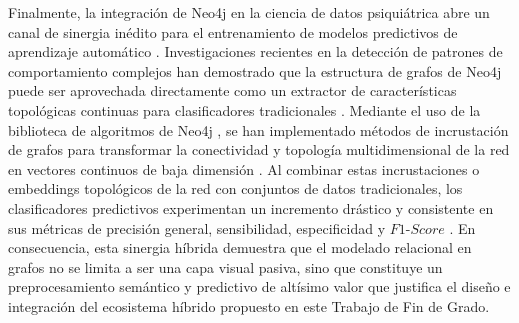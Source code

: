 \documentclass[12pt,a4paper,onecolumn,oneside]{report}
\begin{document}
Finalmente, la integración de Neo4j en la ciencia de datos psiquiátrica abre un canal de sinergia inédito para el entrenamiento de modelos predictivos de aprendizaje automático \cite{raj2022predicting}. Investigaciones recientes en la detección de patrones de comportamiento complejos han demostrado que la estructura de grafos de Neo4j puede ser aprovechada directamente como un extractor de características topológicas continuas para clasificadores tradicionales \cite{raj2022predicting}. Mediante el uso de la biblioteca de algoritmos de Neo4j
, se han implementado métodos de incrustación de grafos para transformar la conectividad y topología multidimensional de la red en vectores continuos de baja dimensión \cite{raj2022predicting}. Al combinar estas incrustaciones o embeddings topológicos de la red con conjuntos de datos tradicionales, los clasificadores predictivos experimentan un incremento drástico y consistente en sus métricas de precisión general, sensibilidad, especificidad y $F1\text{-}Score$ \cite{raj2022predicting}. En consecuencia, esta sinergia híbrida demuestra que el modelado relacional en grafos no se limita a ser una capa visual pasiva, sino que constituye un preprocesamiento semántico y predictivo de altísimo valor que justifica el diseño e integración del ecosistema híbrido propuesto en este Trabajo de Fin de Grado.

\end{document}

